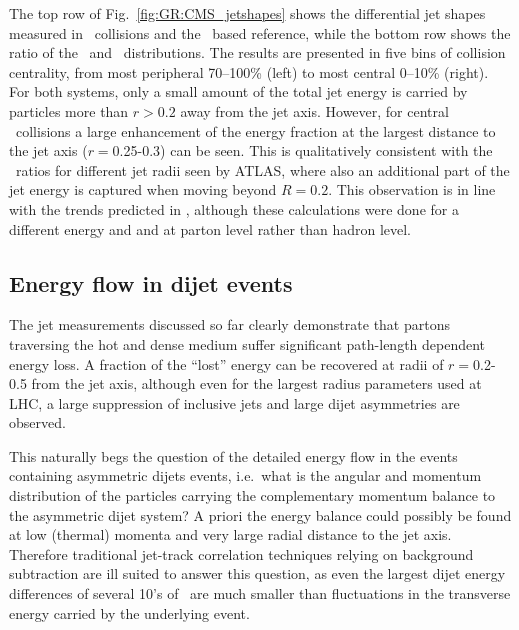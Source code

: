 The top row of Fig.~\ref{fig:GR:CMS_jetshapes} shows the differential jet shapes measured in \PbPb\ 
collisions and the \pp\ based reference, while the bottom row shows the ratio of the \PbPb\ and \pp\ 
distributions. The results are presented in five bins of collision centrality, from
most peripheral 70--100\% (left) to most central 0--10\% (right). For 
both systems, only a small amount of the total jet energy 
is carried by particles more than  $r> 0.2$ away from the jet axis. However, for central 
\PbPb\ collisions a large enhancement of the energy fraction at the largest distance
to the jet axis ($r = $0.25-0.3) can be seen.
This is qualitatively consistent with the \Rcp\ ratios for different jet radii seen by ATLAS, 
where also an additional part of the jet energy is captured when moving beyond $R = 0.2$.  
This observation is in line with the trends predicted in 
\cite{Vitev:2008rz,Renk:2009hv}, although these calculations were
done for a different energy and and at parton level rather than hadron level.

\subsection{Energy flow in dijet events}

The jet measurements discussed so far clearly demonstrate that partons traversing the hot and dense 
medium suffer significant path-length dependent energy loss. A fraction of the ``lost'' energy
can be recovered at radii of $r=$0.2-0.5 from the jet axis, although even for the largest radius
parameters used at LHC, a large suppression of inclusive jets and large dijet asymmetries are
observed. 

This naturally begs the question of the detailed energy flow in the events containing asymmetric
dijets events, i.e.\ what is the angular and momentum distribution of the particles carrying 
the complementary momentum balance to the asymmetric dijet system? A priori the energy balance
could possibly be found at low (thermal) momenta and very large radial distance to the jet axis.
Therefore traditional jet-track correlation techniques relying on background subtraction are ill suited
to answer this question, as even the largest dijet energy differences of several 10's of \GeV\
are much smaller than fluctuations in the transverse energy carried by the underlying event.

